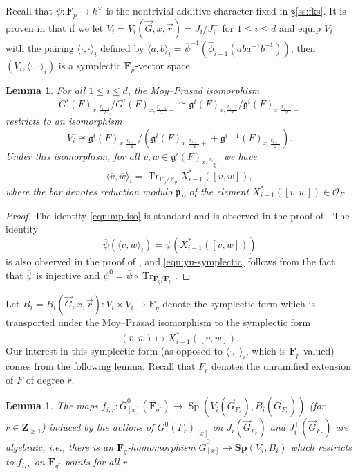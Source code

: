 \documentclass[reqno]{amsart}
\numberwithin{equation}{subsection}
\newcommand{\F}{\mathbf{F}}
\newcommand{\Z}{\mathbf{Z}}
\newcommand{\ol}[1]{\overline{#1}}
\newcommand{\co}{\colon}
\newcommand\cO{\mathcal{O}}
\newcommand\frg{\mathfrak{g}}
\newcommand\frp{\mathfrak{p}}
\DeclareMathOperator{\Tr}{Tr}
\DeclareMathOperator{\Sp}{Sp}
\newtheorem{lemma}[thm]{Lemma}
\theoremstyle{remark}
\numberwithin{equation}{subsection}
\numberwithin{figure}{subsection}
\begin{document}
Recall that $\ol\psi\co \F_p \to k^\times$ is the nontrivial additive character fixed in \S\ref{ss:fks}. It is proven in \cite[Proposition 11.4]{Yu01} that if we let $V_i = V_i(\vec{G},x,\vec{r}) = J_i/J_i^+$ for $1 \leq i\leq d$ and equip $V_i$ with the pairing $\langle \cdot, \cdot\rangle_i$ defined by $\langle a, b\rangle_i = \ol\psi^{-1}(\widehat{\phi}_{i-1}(aba^{-1}b^{-1}))$, then $(V_i, \langle\cdot, \cdot\rangle_i)$ is a symplectic $\F_p$-vector space.

\begin{lemma}\label{lemma:yu-symplectic-form}
For all $1 \leq i \leq d$, the Moy--Prasad isomorphism 
\[
G^i(F)_{x,\frac{r_{i-1}}{2}}/G^i(F)_{x,\frac{r_{i-1}}{2}+} \cong \frg^i(F)_{x,\frac{r_{i-1}}{2}}/\frg^i(F)_{x,\frac{r_{i-1}}{2}+}
\]
restricts to an isomorphism
\begin{equation}\label{eqn:mp-iso}
V_i \cong \frg^i(F)_{x,\frac{r_{i-1}}{2}}/(\frg^i(F)_{x,\frac{r_{i-1}}{2}+} + \frg^{i-1}(F)_{x,\frac{r_{i-1}}{2}}).
\end{equation}
Under this isomorphism, for all $v, w \in \frg^i(F)_{x,\frac{r_{i-1}}{2}}$ we have
\begin{equation}\label{eqn:yu-symplectic}
\langle \ol v, \ol w\rangle_i = \Tr_{\F_q/\F_p}\overline{X_{i-1}^*([v, w])},
\end{equation}
where the bar denotes reduction modulo $\frp_F$ of the element $X_{i-1}^*([v,w])\in\cO_F$.
\end{lemma}

\begin{proof}
The identity \eqref{eqn:mp-iso} is standard and is observed in the proof of \cite[Lemma 11.1]{Yu01}. The identity
\[
\ol\psi(\langle\ol v, \ol w\rangle_i) = \psi(X_{i-1}^*([v,w]))
\]
is also observed in the proof of \cite[Lemma 11.1]{Yu01}, and \eqref{eqn:yu-symplectic} follows from the fact that $\ol\psi$ is injective and $\psi^0=\ol\psi\circ\Tr_{\F_q/\F_p}$.
\end{proof}

Let $B_i = B_i(\vec{G},x,\vec{r})\co V_i \times V_i \to \F_q$ denote the symplectic form which is transported under the Moy--Prasad isomorphism to the symplectic form
\[
(\ol v, \ol w) \mapsto \overline{X_{i-1}^*([v,w])}.
\]
Our interest in this symplectic form (as opposed to $\langle\cdot,\cdot\rangle_i$, which is $\F_p$-valued) comes from the following lemma. Recall that $F_r$ denotes the unramified extension of $F$ of degree $r$.

\begin{lemma}\label{lemma:algebraic-action}
The maps $f_{i,r}\co \ol G^0_{[x]}(\F_{q^r}) \to \Sp(V_i(\vec{G}_{F_r}), B_i(\vec{G}_{F_r}))$ (for $r \in \Z_{\geq 1}$) induced by the actions of $G^0(F_r)_{[x]}$ on $J_i(\vec{G}_{F_r})$ and $J_i^+(\vec{G}_{F_r})$ are algebraic, i.e., there is an $\F_q$-homomorphism $\ol G^0_{[x]} \to \mathbf{Sp}(V_i, B_i)$ which restricts to $f_{i,r}$ on $\F_{q^r}$-points for all $r$.
\end{lemma}
\end{document}
